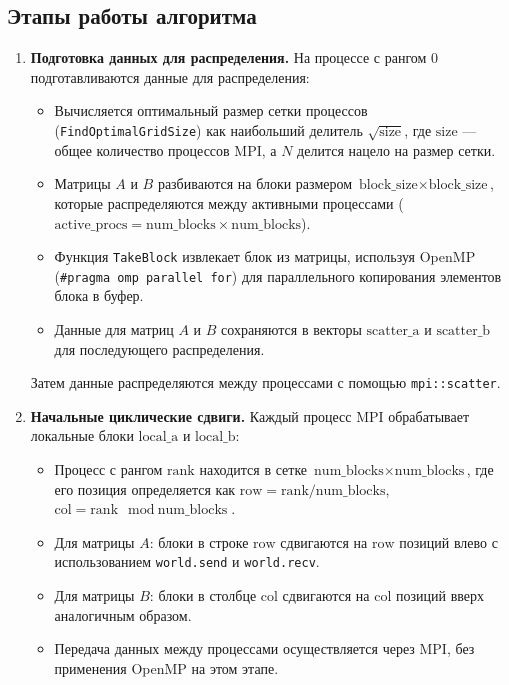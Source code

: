 \documentclass[a4paper,12pt]{article}
\begin{document}
\subsection{Этапы работы алгоритма}

\begin{enumerate}
    \item \textbf{Подготовка данных для распределения.}
    На процессе с рангом 0 подготавливаются данные для распределения:
    \begin{itemize}
        \item Вычисляется оптимальный размер сетки процессов (\texttt{FindOptimalGridSize}) как наибольший делитель \( \sqrt{\text{size}} \), где \( \text{size} \) — общее количество процессов MPI, а \( N \) делится нацело на размер сетки.
        \item Матрицы \( A \) и \( B \) разбиваются на блоки размером \( \text{block\_size} \times \text{block\_size} \), которые распределяются между активными процессами (\( \text{active\_procs} = \text{num\_blocks} \times \text{num\_blocks} \)).
        \item Функция \texttt{TakeBlock} извлекает блок из матрицы, используя OpenMP (\texttt{\#pragma omp parallel for}) для параллельного копирования элементов блока в буфер.
        \item Данные для матриц \( A \) и \( B \) сохраняются в векторы \( \text{scatter\_a} \) и \( \text{scatter\_b} \) для последующего распределения.
    \end{itemize}
    Затем данные распределяются между процессами с помощью \texttt{mpi::scatter}.

    \item \textbf{Начальные циклические сдвиги.}
    Каждый процесс MPI обрабатывает локальные блоки \( \text{local\_a} \) и \( \text{local\_b} \):
    \begin{itemize}
        \item Процесс с рангом \( \text{rank} \) находится в сетке \( \text{num\_blocks} \times \text{num\_blocks} \), где его позиция определяется как \( \text{row} = \text{rank} / \text{num\_blocks} \), \( \text{col} = \text{rank} \mod \text{num\_blocks} \).
        \item Для матрицы \( A \): блоки в строке \( \text{row} \) сдвигаются на \( \text{row} \) позиций влево с использованием \texttt{world.send} и \texttt{world.recv}.
        \item Для матрицы \( B \): блоки в столбце \( \text{col} \) сдвигаются на \( \text{col} \) позиций вверх аналогичным образом.
        \item Передача данных между процессами осуществляется через MPI, без применения OpenMP на этом этапе.
    \end{itemize}


\end{enumerate}
\end{document}
